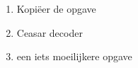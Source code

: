 \begin{enumerate}
  \item Kopi\"eer de opgave
  \item Ceasar decoder
  \item een iets moeilijkere opgave
\end{enumerate}